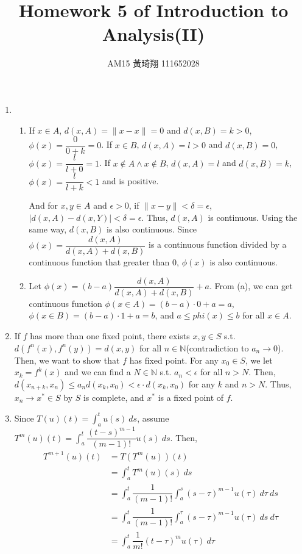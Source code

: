 \documentclass[12pt]{article}
\title{Homework 5 of Introduction to Analysis(II)}
\author{AM15 黃琦翔 111652028}
\begin{document}
\maketitle
\begin{enumerate}
    \item \begin{enumerate}
        \item If $x\in A$, $d(x, A) = \| x-x \| = 0$ and $d(x, B) = k > 0$, $\phi(x) = \dfrac{0}{0 + k} = 0$.
        If $x\in B$, $d(x, A) = l > 0$ and $d(x, B) = 0$, $\phi(x) = \dfrac{l}{l + 0} = 1$.
        If $x \notin A \wedge x \notin B$, $d(x, A) = l$ and $d(x, B) = k$, $\phi(x) = \dfrac{l}{l+k} < 1$ and is positive.

        And for $x, y \in A$ and $\epsilon > 0$,
        if $\| x- y \| < \delta = \epsilon$, 
        $|d(x, A) - d(x, Y)| < \delta = \epsilon$.
        Thus, $d(x, A)$ is continuous.
        Using the same way, $d(x, B)$ is also continuous.
        Since $\phi(x) = \dfrac{d(x, A)}{d(x, A)+d(x, B)}$ is a continuous function divided by a continuous function that greater than $0$,
        $\phi(x)$ is also continuous.

        \item Let $\phi(x) = (b-a)\dfrac{d(x, A)}{d(x, A) + d(x, B)} + a$.
        From (a), we can get continuous function $\phi(x\in A) = (b-a)\cdot 0 + a = a$, $\phi(x\in B) = (b-a)\cdot 1 + a = b$,
        and $a \leq phi(x)\leq b$ for all $x\in A$.
    \end{enumerate}

    \item If $f$ has more than one fixed point, there exists $x, y\in S$ s.t. $d(f^n(x), f^n(y)) = d(x, y)$ for all $n\in\mathbb{N}$(contradiction to $a_n \to 0$).
    Then, we want to show that $f$ has fixed point.
    For any $x_0\in S$, we let $x_k = f^k(x)$ and we can find a $N\in\mathbb{N}$ s.t. $a_n < \epsilon$ for all $n > N$.
    Then, $d(x_{n+k}, x_n) \leq a_n d(x_k, x_0) < \epsilon\cdot d(x_k, x_0)$ for any $k$ and $n > N$.
    Thus, $x_n \to x^*\in S$ by $S$ is complete, and $x^*$ is a fixed point of $f$.

    \item Since $T(u)(t) = \displaystyle\int_a^t u(s)\ ds$, assume $T^m(u)(t) = \displaystyle\int_{a}^{t}\dfrac{(t-s)^{m-1}}{(m-1)!} u(s)\ ds$.
    Then, \begin{align*}
        T^{m+1}(u)(t) &= T(T^m(u))(t)\\
        &= \int_{a}^{t} T^m(u)(s)\ ds\\
        &= \int_{a}^{t} \dfrac{1}{(m-1)!}\int_{a}^{s} (s-\tau)^{m-1} u(\tau)\ d\tau\ ds\\
        &= \int_{a}^{t} \dfrac{1}{(m-1)!}\int_a^\tau (s-\tau)^{m-1} u(\tau)\ ds\ d\tau\\
        &= \int_{a}^{t} \dfrac{1}{m!} (t-\tau)^m u(\tau)\ d\tau
    \end{align*}


\end{enumerate}
\end{document}

